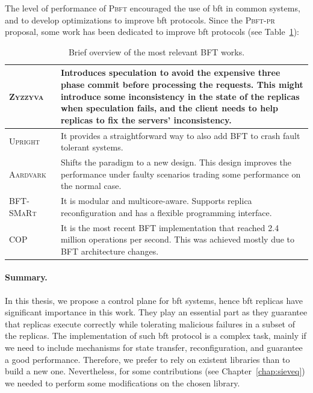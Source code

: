 The level of performance of \textsc{Pbft} encouraged the use of \gls{bft} in common systems, and to develop optimizations to improve \gls{bft} protocols. 
Since the \textsc{Pbft-pr} proposal, some work has been dedicated to improve \gls{bft} protocols (see Table~\ref{tab:bft}):


\begin{table}[h]
\begin{center}
{\footnotesize
\begin{tabular}{ p{2.5cm}  p{10.0cm}  }\hline
\textsc{Zyzzyva}~\cite{Kotla:2010}  & Introduces speculation to avoid the expensive three phase commit before processing the requests. This might introduce some inconsistency in the state of the replicas when speculation fails, and the client needs to help replicas to fix the servers’ inconsistency. \\ \hline            
\textsc{Upright}~\cite{Clement:2009} & It provides a straightforward way to also add BFT to crash fault tolerant systems. \\ \hline    
\textsc{Aardvark}~\cite{Clement:2009b} & Shifts the paradigm to a new design. This design improves the performance under faulty scenarios trading some performance on the normal case. \\ \hline
\textsc{BFT-SMaRt}~\cite{Bessani:2014} & It is modular and multicore-aware. Supports replica reconfiguration and has a flexible programming interface. \\ \hline
\textsc{COP}~\cite{Behl:2015} & It is the most recent BFT implementation that reached 2.4 million operations per second. This was achieved mostly due to BFT architecture changes.\\  \hline  
\end{tabular}
}
\caption{Brief overview of the most relevant BFT works.}

\label{tab:bft}
\end{center}
\end{table}




\paragraph{Summary.} 

In this thesis, we propose a control plane for \gls{bft} systems, hence \gls{bft} replicas have significant importance in this work.
They play an essential part as they guarantee that replicas execute correctly while tolerating malicious failures in a subset of the replicas.
The implementation of such \gls{bft} protocol is a complex task, mainly if we need to include mechanisms for state transfer, reconfiguration, and guarantee a good performance.
Therefore, we prefer to rely on existent libraries than to build a new one.
Nevertheless, for some contributions (see Chapter~\ref{chap:sieveq}) we needed to perform some modifications on the chosen library.

